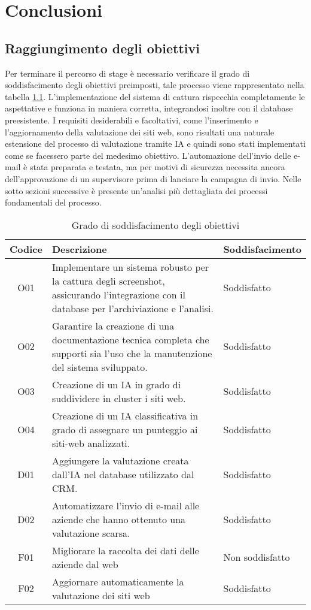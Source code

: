 \chapter{Conclusioni}
\label{cap:conclusioni}


\section{Raggiungimento degli obiettivi}
Per terminare il percorso di stage è necessario verificare il grado di soddisfacimento degli obiettivi preimposti, tale processo viene rappresentato nella tabella \ref{soddisfazione}.
L'implementazione del sistema di cattura rispecchia completamente le aspettative e funziona in maniera corretta, integrandosi inoltre con il database preesistente.
I requisiti desiderabili e facoltativi, come l'inserimento e l'aggiornamento della valutazione dei siti web, sono risultati una naturale estensione del processo di valutazione tramite IA e quindi sono stati implementati come se facessero parte del medesimo obiettivo.
L'automazione dell'invio delle e-mail è stata preparata e testata, ma per motivi di sicurezza necessita ancora dell'approvazione di un supervisore prima di lanciare la campagna di invio.
Nelle sotto sezioni successive è presente un'analisi più dettagliata dei processi fondamentali del processo.

\newpage
\begin{table}[!htbp]
    \centering
    \begin{tabularx}{0.8\textwidth}{|c|X|X|}
    \hline
    \textbf{Codice} & \textbf{Descrizione} & \textbf{Soddisfacimento}\\
    \hline
    O01 & Implementare un sistema robusto per la cattura degli screenshot, assicurando l’integrazione con il database per l’archiviazione e l’analisi. & Soddisfatto\\
    \hline
    O02 & Garantire la creazione di una documentazione tecnica completa che supporti sia l’uso che la manutenzione  del sistema sviluppato. & Soddisfatto\\
    \hline
    O03 & Creazione di un IA in grado di suddividere in cluster i siti web. & Soddisfatto\\
    \hline
    O04 & Creazione di un IA classificativa in grado di assegnare un punteggio ai siti-web analizzati. & Soddisfatto\\
    \hline
    D01 & Aggiungere la valutazione creata dall'IA nel database utilizzato dal CRM. & Soddisfatto\\
    \hline
    D02 & Automatizzare l'invio di e-mail alle aziende che hanno ottenuto una valutazione scarsa. & Soddisfatto\\
    \hline
    F01 & Migliorare la raccolta dei dati delle aziende dal web & Non soddisfatto\\
    \hline
    F02 & Aggiornare automaticamente la valutazione dei siti web & Soddisfatto\\
    \hline
    \end{tabularx}
    \caption{Grado di soddisfacimento degli obiettivi}
    \label{soddisfazione}
\end{table}



